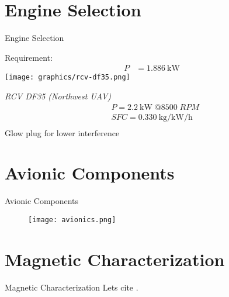 \section{Engine Selection}
\begin{frame}{Engine Selection}
    \begin{minipage}[t]{0.5\textwidth}
        \large{Requirement:}
        \centering
        \begin{align*}
            P &= \SI{1.886}{\kilo\watt} 
        \end{align*}
        \centering
        \texttt{[image: graphics/rcv-df35.png]}
    \end{minipage}%
    \begin{minipage}[t]{0.5\textwidth}
        \emph{RCV DF35 (Northwest UAV)}
        \centering
        \begin{align*}
            &P = \SI{2.2}{\kilo\watt}\;@8500\;RPM \\
            &SFC = \SI{0.330}{\kilogram\per\kilo\watt\per\hour} \\
        \end{align*}
        \large{Glow plug for lower interference}
        \centering
    \end{minipage}%
    
\end{frame}
\section{Avionic Components}
\begin{frame}{Avionic Components}
    \begin{figure}
        \texttt{[image: avionics.png]}
    \end{figure}   
\end{frame}
\section{Magnetic Characterization}
\begin{frame}{Magnetic Characterization}
    Lets cite \cite{hansen}.
    \cite{corke}
\end{frame}
